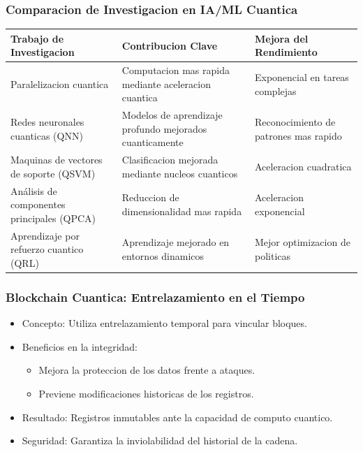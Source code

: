 \documentclass[article]{beamer}
\begin{document}
\begin{frame}
\frametitle{Comparacion de Investigacion en IA/ML Cuantica}

\small
\begin{tabularx}{\textwidth}{|X|X|X|}
\hline
Trabajo de Investigacion & Contribucion Clave & Mejora del Rendimiento \\ \hline
Paralelizacion cuantica & Computacion mas rapida mediante aceleracion cuantica & Exponencial en tareas complejas \\ \hline
Redes neuronales cuanticas (QNN) & Modelos de aprendizaje profundo mejorados cuanticamente & Reconocimiento de patrones mas rapido \\ \hline
Maquinas de vectores de soporte (QSVM) & Clasificacion mejorada mediante nucleos cuanticos & Aceleracion cuadratica \\ \hline
Análisis de componentes principales (QPCA) & Reduccion de dimensionalidad mas rapida & Aceleracion exponencial \\ \hline
Aprendizaje por refuerzo cuantico (QRL) & Aprendizaje mejorado en entornos dinamicos & Mejor optimizacion de politicas \\ \hline
\end{tabularx}

\end{frame}

\begin{frame}
\frametitle{Blockchain Cuantica: Entrelazamiento en el Tiempo}

\begin{itemize}
    \item Concepto: Utiliza entrelazamiento temporal para vincular bloques.
    \item Beneficios en la integridad:
        \begin{itemize}
            \item Mejora la proteccion de los datos frente a ataques.
            \item Previene modificaciones historicas de los registros.
        \end{itemize}
    \item Resultado: Registros inmutables ante la capacidad de computo cuantico.
    \item Seguridad: Garantiza la inviolabilidad del historial de la cadena.
\end{itemize}

\end{frame}
\end{document}
